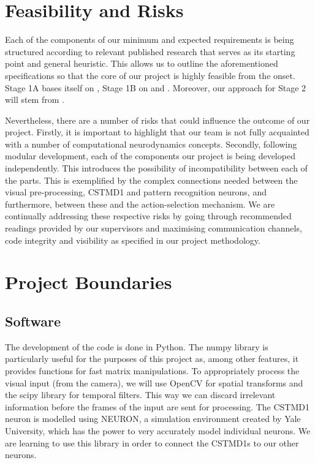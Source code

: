 \documentclass[a4paper,11pt]{article}
\begin{document}

\section{Feasibility and Risks}

Each of the components of our minimum and expected requirements is being structured according to relevant published research that serves as its starting point and general heuristic. This allows us to outline the aforementioned specifications so that the core of our project is highly feasible from the onset. Stage 1A bases itself on \cite{hal11}, Stage 1B on \cite{stdp1} and \cite{stdp2}. Moreover, our approach for Stage 2 will stem from \cite{tsdn}.

Nevertheless, there are a number of risks that could influence the outcome of our project. Firstly, it is important to highlight that our team is not fully acquainted with a number of computational neurodynamics concepts. Secondly, following modular development, each of the components our project is being developed independently. This introduces the possibility of incompatibility between each of the parts. This is exemplified by the complex connections needed between the visual pre-processing, CSTMD1 and pattern recognition neurons, and furthermore, between these and the action-selection mechanism. We are continually addressing these respective risks by going through recommended readings provided by our supervisors and maximising communication channels, code integrity and visibility as specified in our project methodology.

\section{Project Boundaries}

\subsection{Software}
The development of the code is done in Python. The numpy library is particularly useful for the purposes of this project as, among other features, it provides functions for fast matrix manipulations.
To appropriately process the visual input (from the camera), we will use OpenCV for spatial transforms and the scipy library for temporal filters. This way we can discard irrelevant information before the frames of the input are sent for processing.
The CSTMD1 neuron is modelled using NEURON, a simulation environment created by Yale University, which has the power to very accurately model individual neurons. We are learning to use this library in order to connect the CSTMD1s to our other neurons.
\end{document}
